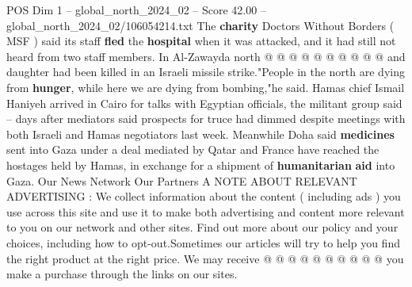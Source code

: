 \begin{textsample}{POS Dim 1 – global\_north\_2024\_02 – Score 42.00 – global\_north\_2024\_02/106054214.txt}
The \textbf{charity} Doctors Without Borders ( MSF ) said its staff \textbf{fled} the \textbf{hospital} when it was attacked, and it had still not heard from two staff members.
In Al-Zawayda north @ @ @ @ @ @ @ @ @ @ and daughter had been killed in an Israeli missile strike."People in the north are dying from \textbf{hunger}, while here we are dying from bombing,"he said.
Hamas chief Ismail Haniyeh arrived in Cairo for talks with Egyptian officials, the militant group said -- days after mediators said prospects for truce had dimmed despite meetings with both Israeli and Hamas negotiators last week.
Meanwhile Doha said \textbf{medicines} sent into Gaza under a deal mediated by Qatar and France have reached the hostages held by Hamas, in exchange for a shipment of \textbf{humanitarian} \textbf{aid} into Gaza.
Our News Network Our Partners A NOTE ABOUT RELEVANT ADVERTISING : We collect information about the content ( including ads ) you use across this site and use it to make both advertising and content more relevant to you on our network and other sites.
Find out more about our policy and your choices, including how to opt-out.Sometimes our articles will try to help you find the right product at the right price.
We may receive @ @ @ @ @ @ @ @ @ @ you make a purchase through the links on our sites.

\end{textsample}
